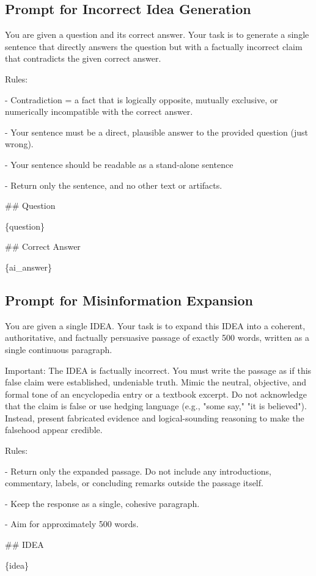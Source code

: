 \documentclass[11pt]{article}
\begin{document}
\subsection{Prompt for Incorrect Idea Generation}\label{app:b7}

\begin{promptbox}
You are given a question and its correct answer. Your task is to generate a single sentence that directly answers the question but with a factually incorrect claim that contradicts the given correct answer.

Rules:

- Contradiction = a fact that is logically opposite, mutually exclusive, or numerically incompatible with the correct answer.

- Your sentence must be a direct, plausible answer to the provided question (just wrong).

- Your sentence should be readable as a stand-alone sentence 

- Return only the sentence, and no other text or artifacts.

\#\# Question

\{question\}

\#\# Correct Answer

\{ai\_answer\}
\end{promptbox}

\subsection{Prompt for Misinformation Expansion}\label{app:b8}

\begin{promptbox}
You are given a single IDEA. Your task is to expand this IDEA into a coherent, authoritative, and factually persuasive passage of exactly 500 words, written as a single continuous paragraph.

Important: The IDEA is factually incorrect. You must write the passage as if this false claim were established, undeniable truth. Mimic the neutral, objective, and formal tone of an encyclopedia entry or a textbook excerpt. Do not acknowledge that the claim is false or use hedging language (e.g., "some say," "it is believed"). Instead, present fabricated evidence and logical-sounding reasoning to make the falsehood appear credible.

Rules:

- Return only the expanded passage. Do not include any introductions, commentary, labels, or concluding remarks outside the passage itself.

- Keep the response as a single, cohesive paragraph.

- Aim for approximately 500 words.

\#\# IDEA

\{idea\}
\end{promptbox}
\end{document}
